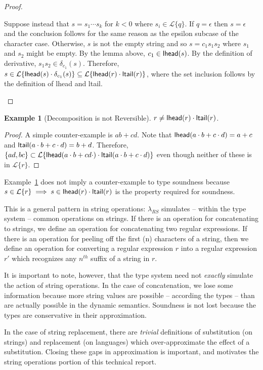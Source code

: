 \documentclass[11pt,leqno]{article}
\newtheorem{trexam}[tr]{Example}
\theoremstyle{definition}
\newcommand{\Lagr}{\mathcal{L}}
\newcommand{\lang}[1]{\Lagr\{#1\}}
\newcommand{\lambdas}{\lambda_{RS}}
\newcommand{\lhead}[1]{ {\sf lhead}(#1) }
\newcommand{\ltail}[1]{ {\sf ltail}(#1) }
\begin{document}
\begin{proof}
\begin{itemize}[label=$ $,itemsep=1ex]
Suppose instead that $s = s_1 \cdots s_k$ for $k < 0$ where $s_i \in \lang{q}$.
If $q = \epsilon$ then $s = \epsilon$ and the conclusion follows for the same reason as the epsilon subcase of the character case.
Otherwise, $s$ is not the empty string and so $s = c_1 s_1 s_2$ where $s_1$ and $s_2$ might be empty.
By the lemma above, $c_1 \in \lhead{s}$.
By the definition of derivative, $s_1s_2 \in \delta_{c_1}(s)$.
Therefore, $s \in \lang{\lhead{s} \cdot \delta_{c_1}(s)} \subseteq \lang{\lhead{r} \cdot \ltail{r}}$, where the set inclusion follows by the definition
of lhead and ltail.
\end{itemize}
\end{proof}

\begin{trexam}[Decomposition is not Reversible]\label{exam:headsandtails}
$r \not = \lhead{r} \cdot \ltail{r}$.
\end{trexam}
\begin{proof}
A simple counter-example is $ab + cd$. 
Note that $\lhead{a\cdot b + c\cdot d} = a+c$ and $\ltail{a\cdot b + c\cdot d} = b + d$. 
Therefore, $\{ad,bc\} \subset \lang{\lhead{a\cdot b + cd\cdot } \cdot \ltail{a\cdot b + c\cdot d}}$ even though neither of these is in $\lang{r}$.
\end{proof}

Example~\ref{exam:headsandtails} does not imply a counter-example to type soundness because $s \in \lang{r} \implies s \in \lhead{r}\cdot\ltail{r}$ is the
property required for soundness. 

This is a general pattern in string operations: $\lambdas$ simulates -- within the type system -- common operations on strings. 
If there is an operation for concatenating to strings, we define an operation for concatenating two regular expressions.
If there is an operation for peeling off the first (n) characters of a string, then we define an operation for 
converting a regular expression $r$ into a regular expression $r'$ which recognizes any $n^{th}$ suffix of a string in $r$.

It is important to note, however, that the type system need not \emph{exactly} simulate the action of string operations.
In the case of concatenation, we lose some information because more string values are possible -- according the types --
than are actually possible in the dynamic semantics.
Soundness is not lost because the types are conservative in their approximation.

In the case of string replacement, there are \emph{trivial} definitions of substitution (on strings) and replacement (on languages) which over-approximate 
the effect of a substitution. Closing these gaps in approximation is important, and motivates the string operations portion of this technical report.
\end{document}
